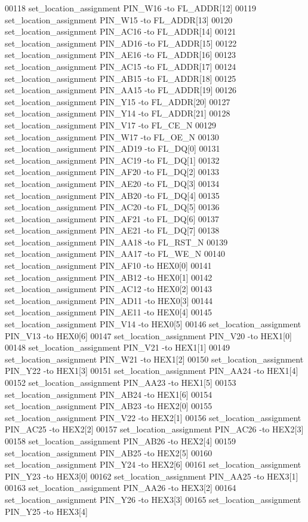 \begin{DoxyCode}
00118 set\_location\_assignment PIN\_W16 -to FL\_ADDR[12]
00119 set\_location\_assignment PIN\_W15 -to FL\_ADDR[13]
00120 set\_location\_assignment PIN\_AC16 -to FL\_ADDR[14]
00121 set\_location\_assignment PIN\_AD16 -to FL\_ADDR[15]
00122 set\_location\_assignment PIN\_AE16 -to FL\_ADDR[16]
00123 set\_location\_assignment PIN\_AC15 -to FL\_ADDR[17]
00124 set\_location\_assignment PIN\_AB15 -to FL\_ADDR[18]
00125 set\_location\_assignment PIN\_AA15 -to FL\_ADDR[19]
00126 set\_location\_assignment PIN\_Y15 -to FL\_ADDR[20]
00127 set\_location\_assignment PIN\_Y14 -to FL\_ADDR[21]
00128 set\_location\_assignment PIN\_V17 -to FL\_CE\_N
00129 set\_location\_assignment PIN\_W17 -to FL\_OE\_N
00130 set\_location\_assignment PIN\_AD19 -to FL\_DQ[0]
00131 set\_location\_assignment PIN\_AC19 -to FL\_DQ[1]
00132 set\_location\_assignment PIN\_AF20 -to FL\_DQ[2]
00133 set\_location\_assignment PIN\_AE20 -to FL\_DQ[3]
00134 set\_location\_assignment PIN\_AB20 -to FL\_DQ[4]
00135 set\_location\_assignment PIN\_AC20 -to FL\_DQ[5]
00136 set\_location\_assignment PIN\_AF21 -to FL\_DQ[6]
00137 set\_location\_assignment PIN\_AE21 -to FL\_DQ[7]
00138 set\_location\_assignment PIN\_AA18 -to FL\_RST\_N
00139 set\_location\_assignment PIN\_AA17 -to FL\_WE\_N
00140 set\_location\_assignment PIN\_AF10 -to HEX0[0]
00141 set\_location\_assignment PIN\_AB12 -to HEX0[1]
00142 set\_location\_assignment PIN\_AC12 -to HEX0[2]
00143 set\_location\_assignment PIN\_AD11 -to HEX0[3]
00144 set\_location\_assignment PIN\_AE11 -to HEX0[4]
00145 set\_location\_assignment PIN\_V14 -to HEX0[5]
00146 set\_location\_assignment PIN\_V13 -to HEX0[6]
00147 set\_location\_assignment PIN\_V20 -to HEX1[0]
00148 set\_location\_assignment PIN\_V21 -to HEX1[1]
00149 set\_location\_assignment PIN\_W21 -to HEX1[2]
00150 set\_location\_assignment PIN\_Y22 -to HEX1[3]
00151 set\_location\_assignment PIN\_AA24 -to HEX1[4]
00152 set\_location\_assignment PIN\_AA23 -to HEX1[5]
00153 set\_location\_assignment PIN\_AB24 -to HEX1[6]
00154 set\_location\_assignment PIN\_AB23 -to HEX2[0]
00155 set\_location\_assignment PIN\_V22 -to HEX2[1]
00156 set\_location\_assignment PIN\_AC25 -to HEX2[2]
00157 set\_location\_assignment PIN\_AC26 -to HEX2[3]
00158 set\_location\_assignment PIN\_AB26 -to HEX2[4]
00159 set\_location\_assignment PIN\_AB25 -to HEX2[5]
00160 set\_location\_assignment PIN\_Y24 -to HEX2[6]
00161 set\_location\_assignment PIN\_Y23 -to HEX3[0]
00162 set\_location\_assignment PIN\_AA25 -to HEX3[1]
00163 set\_location\_assignment PIN\_AA26 -to HEX3[2]
00164 set\_location\_assignment PIN\_Y26 -to HEX3[3]
00165 set\_location\_assignment PIN\_Y25 -to HEX3[4]

\end{DoxyCode}
